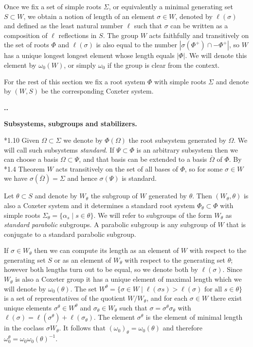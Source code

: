 \documentclass[11pt,fleqn]{amsart}
\renewcommand\thesection{\arabic{section}}
\newcounter{para}[section]
\renewcommand\thepara{\thesection.\arabic{para}}
\def\paragraph{%
 \noindent
 \refstepcounter{para}%
 \textbf{\thepara.}\hspace{1ex}%
}
\newcommand\about[1]{%
 {\bfseries#1.}%
}
\begin{document}
Once we fix a set of simple roots $\Sigma$, or equivalently a minimal 
generating set $S \subset W$, we obtain a notion of length of an element 
$\sigma \in W$, denoted by $\ell(\sigma)$ and defined as the least natural 
number $\ell$ such that $\sigma$ can be written as a composition of $\ell$ 
reflections in $S$. The group $W$ acts faithfully and transitively on the set 
of roots $\Phi$ and $\ell(\sigma)$ is also equal to the number $|\sigma(\Phi^+)
\cap -\Phi^+|$, so $W$ has a unique longest longest element whose length 
equals $|\Phi|$. We will denote this element by $\omega_0(W)$, or simply 
$\omega_0$ if the group is clear from the context.

For the rest of this section we fix a root system $\Phi$ with simple roots 
$\Sigma$ and denote by $(W,S)$ be the corresponding Coxeter system. 

\paragraph
\about{Subsystems, subgroups and stabilizers} 
\cite{Hump-coxeter-book}*{1.10}
Given $\Omega \subset \Sigma$ we denote by 
$\Phi(\Omega)$ the root subsystem generated by $\Omega$. We will call such 
subsystems \emph{standard}. If $\Psi \subset \Phi$ is an arbitrary subsystem 
then we can choose a basis $\Omega \subset \Psi$, and that basis can be 
extended to a basis $\overline \Omega$ of $\Phi$. By 
\cite{Hump-coxeter-book}*{1.4 Theorem} $W$ acts transitively on the set of all
bases of $\Phi$, so for some $\sigma \in W$ we have $\sigma(\overline \Omega) =
\Sigma$ and hence $\sigma(\Psi)$ is standard. 

Let $\theta \subset S$ and denote by $W_\theta$ the subgroup of $W$ generated 
by $\theta$. Then $(W_\theta, \theta)$ is also a Coxeter system and it 
determines a standard root system $\Phi_\theta \subset \Phi$ with simple roots 
$\Sigma_\theta = \{\alpha_s \mid s \in \theta\}$. We will refer to subgroups 
of the form $W_\theta$ as \emph{standard parabolic} subgroups. A parabolic 
subgroup is any subgroup of $W$ that is conjugate to a standard parabolic 
subgroup.

If $\sigma \in W_\theta$ then we can compute its length as an element of $W$ 
with respect to the generating set $S$ or as an element of $W_\theta$ with 
respect to the generating set $\theta$; however both lengths turn out to be 
equal, so we denote both by $\ell(\sigma)$. Since $W_\theta$ is also a Coxeter 
group it has a unique element of maximal length which we will denote by 
$\omega_0(\theta)$. The set $W^\theta = \{\sigma \in W \mid \ell(\sigma s) > 
\ell(\sigma) \mbox{ for all } s \in \theta\}$ is a set of representatives of 
the quotient $W/W_\theta$, and for each $\sigma \in W$ there exist unique 
elements $\sigma^\theta \in W^\theta$ and $\sigma_\theta \in W_\theta$ such 
that $\sigma = \sigma^\theta\sigma_\theta$ with $\ell(\sigma) = 
\ell(\sigma^\theta) + \ell(\sigma_\theta)$. The element $\sigma^\theta$ is the 
element of minimal length in the coclass $\sigma W_\theta$. It follows that 
$(\omega_0)_\theta = \omega_0(\theta)$ and therefore $\omega_0^\theta = 
\omega_0 \omega_0(\theta)^{-1}$.
\end{document}
